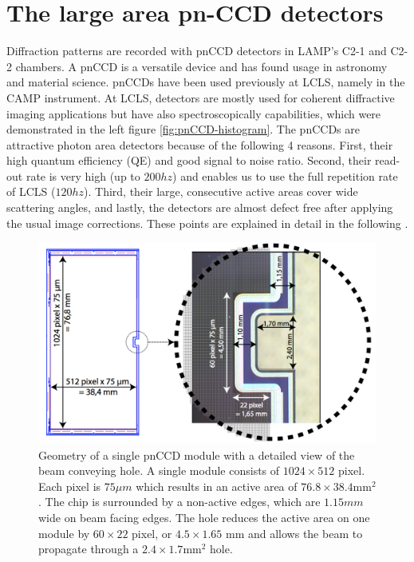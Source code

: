 \section{The large area pn-CCD detectors}\label{sec:pnCCD}
Diffraction patterns are recorded with pnCCD detectors in LAMP's C2-1 and C2-2 chambers. A pnCCD is a versatile device and has found usage in astronomy and material science. pnCCDs have been used previously at LCLS, namely in the CAMP instrument. At LCLS, detectors are mostly used for coherent diffractive imaging applications but have also spectroscopically capabilities, which were demonstrated in the left figure \ref{fig:pnCCD-histogram}. The pnCCDs are attractive photon area detectors because of the following 4 reasons. First, their high quantum efficiency (QE) and good signal to noise ratio. Second, their read-out rate is very high (up to $200hz$) and enables us to use the full repetition rate of LCLS ($120hz$). Third, their large, consecutive active areas cover wide scattering angles, and lastly, the detectors are almost defect free after applying the usual image corrections. These points are explained in detail in the following \citep{Bucher-2016-Unpublished}.\\
%
\begin{figure}
   \includegraphics[width=0.9\linewidth]{images/pnCCD-detail.png}
    \caption[Geometry of a single pnCCD module.]{Geometry of a single pnCCD module with a detailed view of the beam conveying hole. A single module consists of $1024 \times 512$ pixel. Each pixel is $75 \mu m$ which results in an active area of $76.8 \times 38.4 \mathrm{mm}^{2}$. The chip is surrounded by a non-active edges, which are $1.15 mm$ wide on beam facing edges. The hole reduces the active area on one module by $60\times 22$ pixel, or $4.5 \times 1.65$ mm and allows the beam to propagate through a $2.4 \times 1.7 \mathrm{mm}^{2}$ hole.}
\label{fig:ccd-detail}
\end{figure}

